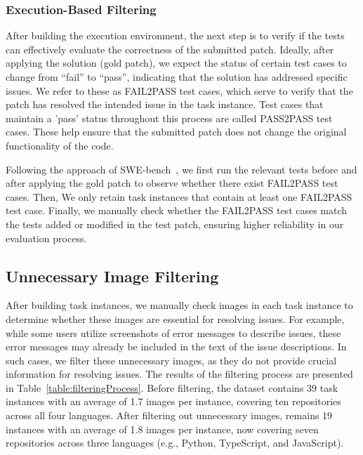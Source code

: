 \subsubsection{Execution-Based Filtering}
After building the execution environment, the next step is to verify if the tests can effectively evaluate the correctness of the submitted patch. Ideally, after applying the solution (gold patch), we expect the status of certain test cases to change from ``fail'' to ``pass'', indicating that the solution has addressed specific issues. We refer to these as FAIL2PASS test cases, which serve to verify that the patch has resolved the intended issue in the task instance. Test cases that maintain a 'pass' status throughout this process are called PASS2PASS test cases. These help ensure that the submitted patch does not change the original functionality of the code.

Following the approach of SWE-bench~\cite{jimenez2023swe}, we first run the relevant tests before and after applying the gold patch to observe whether there exist FAIL2PASS test cases. Then, We only retain task instances that contain at least one FAIL2PASS test case. Finally, we manually check whether the FAIL2PASS test cases match the tests  added or modified in the test patch, ensuring higher reliability in our evaluation process.


\subsection{Unnecessary Image Filtering}  
After building task instances, we manually check images in each task instance to determine whether these images are essential for resolving issues. For example, while some users utilize screenshots of error messages to describe issues, these error messages may already be included in the text of the issue descriptions. In such cases, we filter these unnecessary images, as they do not provide crucial information for resolving issues.
The results of the filtering process are presented in Table~\ref{table:filteringProcess}. Before filtering, the dataset contains 39 task instances with an average of 1.7 images per instance, covering ten repositories across all four languages. After filtering out unnecessary images, \Swebenchx remains 19 instances with an average of 1.8 images per instance, now covering seven repositories across three languages (e.g., Python, TypeScript, and JavaScript).


